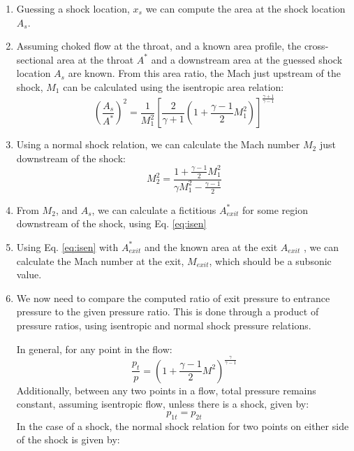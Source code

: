 \documentclass[11pt]{article}%
\numberwithin{equation}{section}
\begin{document}
\begin{enumerate}
\item Guessing a shock location, $ x_s $ we can compute the area at the shock location $ A_s $.
\item 
Assuming choked flow at the throat, and a known area profile, the cross-sectional area at the throat $ A^* $ and a downstream area at the guessed shock location $ A_s $ are known. From this area ratio, the Mach just upstream of the shock, $ M_1 $ can be calculated using the isentropic area relation:
\begin{equation} \label{eq:isen}
\left( \frac{A_s}{A^*}\right)^2=\frac{1}{M_1^2} \left[ \frac{2}{\gamma +1} \left(1+\frac{\gamma-1}{2} M_1^2 \right) \right]^{\frac{\gamma+1}{\gamma-1}}
\end{equation}

\item Using a normal shock relation, we can calculate the Mach number $ M_2 $ just downstream of the shock:
\begin{equation}
M_2^2=\frac{1+\frac{\gamma-1}{2}M_1^2}{\gamma M_1^2-\frac{\gamma-1}{2}}
\end{equation}


\item From $ M_2 $, and $ A_s $, we can calculate a fictitious $ A^*_{exit} $ for some region downstream of the shock, using Eq. \ref{eq:isen}

\item Using Eq. \ref{eq:isen} with $ A^*_{exit} $ and the known area at the exit $ A_{exit} $ , we can calculate the Mach number at the exit, $ M_{exit} $, which should be a subsonic value.

\item We now need to compare the computed ratio of exit pressure to entrance pressure to the given pressure ratio. This is done through a product of pressure ratios, using isentropic and normal shock pressure relations.

In general, for any point in the flow:
\begin{equation} \label{eq:pt}
\frac{p_t}{p}=\left(1+\frac{\gamma-1}{2}M^2\right)^{\frac{\gamma}{\gamma-1}}
\end{equation}
Additionally, between any two points in a flow, total pressure remains constant, assuming isentropic flow, unless there is a shock, given by:
\begin{equation}
p_{1t}=p_{2t}
\end{equation}
In the case of a shock, the normal shock relation for two points on either side of the shock is given by:


\end{enumerate}
\end{document}
